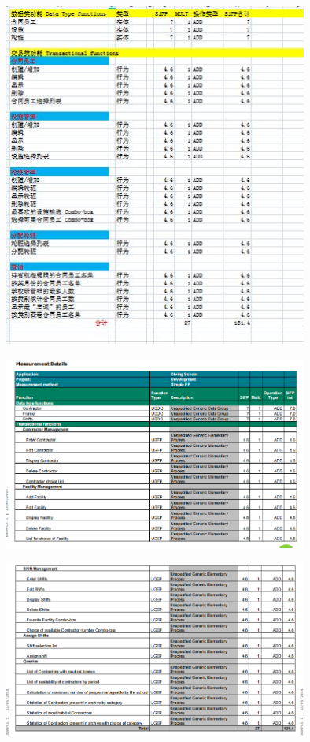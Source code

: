 
\includegraphics[width=10cm]{微信截图20220412130822.jpg}


\includegraphics[width=10cm]{微信截图20210330152654.png}


\includegraphics[width=10cm]{微信截图20210330152702.png}


